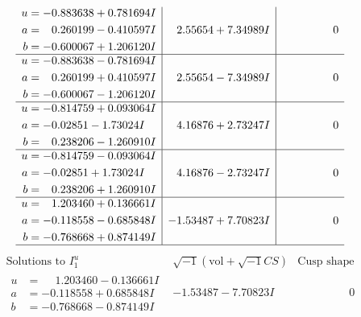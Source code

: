 \documentclass[1p]{elsarticle_modified}
\theoremstyle{definition}
\newcommand{\I}{\sqrt{-1}}
\begin{document}
$$\begin{array}{c|c|c}
\begin{aligned}
u &= -0.883638 + 0.781694 I \\
a &= \phantom{-}0.260199 - 0.410597 I \\
b &= -0.600067 + 1.206120 I\end{aligned}
 & \phantom{-}2.55654 + 7.34989 I & \phantom{-0.000000 } 0 \\ \hline\begin{aligned}
u &= -0.883638 - 0.781694 I \\
a &= \phantom{-}0.260199 + 0.410597 I \\
b &= -0.600067 - 1.206120 I\end{aligned}
 & \phantom{-}2.55654 - 7.34989 I & \phantom{-0.000000 } 0 \\ \hline\begin{aligned}
u &= -0.814759 + 0.093064 I \\
a &= -0.02851 - 1.73024 I \\
b &= \phantom{-}0.238206 - 1.260910 I\end{aligned}
 & \phantom{-}4.16876 + 2.73247 I & \phantom{-0.000000 } 0 \\ \hline\begin{aligned}
u &= -0.814759 - 0.093064 I \\
a &= -0.02851 + 1.73024 I \\
b &= \phantom{-}0.238206 + 1.260910 I\end{aligned}
 & \phantom{-}4.16876 - 2.73247 I & \phantom{-0.000000 } 0 \\ \hline\begin{aligned}
u &= \phantom{-}1.203460 + 0.136661 I \\
a &= -0.118558 - 0.685848 I \\
b &= -0.768668 + 0.874149 I\end{aligned}
 & -1.53487 + 7.70823 I & \phantom{-0.000000 } 0\\
 \hline 
 \end{array}$$\newpage$$\begin{array}{c|c|c}  
\text{Solutions to }I^u_{1}& \I (\text{vol} + \sqrt{-1}CS) & \text{Cusp shape}\\
 \hline 
\begin{aligned}
u &= \phantom{-}1.203460 - 0.136661 I \\
a &= -0.118558 + 0.685848 I \\
b &= -0.768668 - 0.874149 I\end{aligned}
 & -1.53487 - 7.70823 I & \phantom{-0.000000 } 0 \\ \hline\begin{aligned}

\end{aligned}
\end{array}$$
\end{document}
